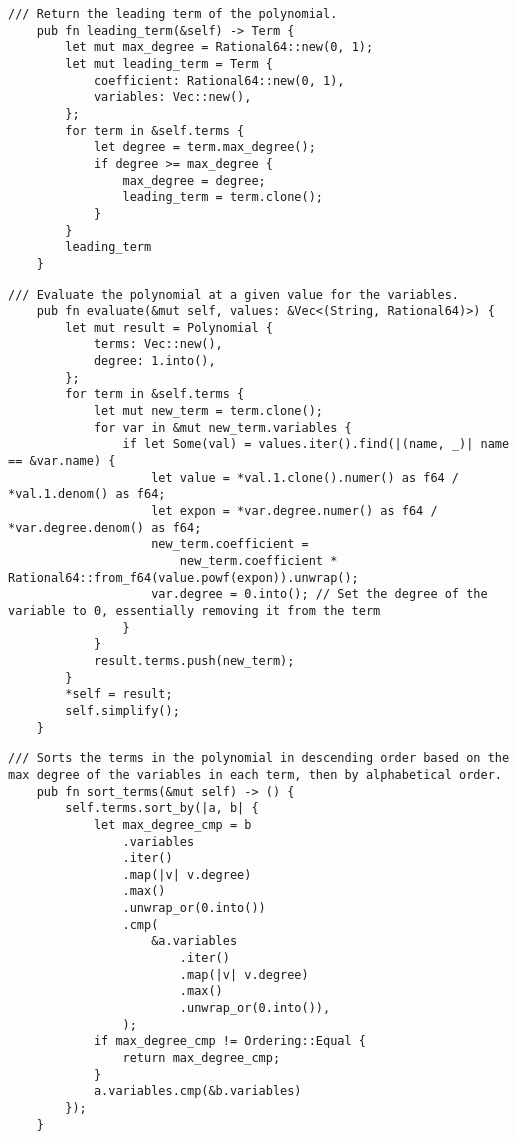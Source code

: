 \begin{lstlisting}[caption={The implementation of the \texttt{leading\_term()} method for the \texttt{Polynomial} struct}, label={lst:polynomial-leading-term}]
    /// Return the leading term of the polynomial.
    pub fn leading_term(&self) -> Term {
        let mut max_degree = Rational64::new(0, 1);
        let mut leading_term = Term {
            coefficient: Rational64::new(0, 1),
            variables: Vec::new(),
        };
        for term in &self.terms {
            let degree = term.max_degree();
            if degree >= max_degree {
                max_degree = degree;
                leading_term = term.clone();
            }
        }
        leading_term
    }
\end{lstlisting}

\begin{lstlisting}[caption={The implementation of the \texttt{evaluate()} method for the \texttt{Polynomial} struct}, label={lst:polynomial-evaluate}]
    /// Evaluate the polynomial at a given value for the variables.
    pub fn evaluate(&mut self, values: &Vec<(String, Rational64)>) {
        let mut result = Polynomial {
            terms: Vec::new(),
            degree: 1.into(),
        };
        for term in &self.terms {
            let mut new_term = term.clone();
            for var in &mut new_term.variables {
                if let Some(val) = values.iter().find(|(name, _)| name == &var.name) {
                    let value = *val.1.clone().numer() as f64 / *val.1.denom() as f64;
                    let expon = *var.degree.numer() as f64 / *var.degree.denom() as f64;
                    new_term.coefficient =
                        new_term.coefficient * Rational64::from_f64(value.powf(expon)).unwrap();
                    var.degree = 0.into(); // Set the degree of the variable to 0, essentially removing it from the term
                }
            }
            result.terms.push(new_term);
        }
        *self = result;
        self.simplify();
    }
\end{lstlisting}

\begin{lstlisting}[caption={The implementation of the \texttt{sort\_terms()} method for the \texttt{Polynomial} struct}, label={lst:polynomial-sort-terms}]
    /// Sorts the terms in the polynomial in descending order based on the max degree of the variables in each term, then by alphabetical order.
    pub fn sort_terms(&mut self) -> () {
        self.terms.sort_by(|a, b| {
            let max_degree_cmp = b
                .variables
                .iter()
                .map(|v| v.degree)
                .max()
                .unwrap_or(0.into())
                .cmp(
                    &a.variables
                        .iter()
                        .map(|v| v.degree)
                        .max()
                        .unwrap_or(0.into()),
                );
            if max_degree_cmp != Ordering::Equal {
                return max_degree_cmp;
            }
            a.variables.cmp(&b.variables)
        });
    }
\end{lstlisting}


